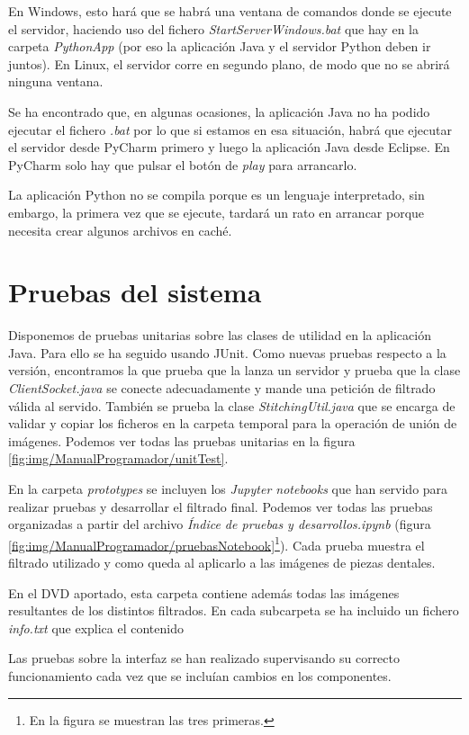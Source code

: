 
En Windows, esto hará que se habrá una ventana de comandos donde se ejecute el servidor, haciendo uso del fichero \textit{StartServerWindows.bat} que hay en la carpeta \textit{PythonApp} (por eso la aplicación Java y el servidor Python deben ir juntos). En Linux, el servidor corre en segundo plano, de modo que no se abrirá ninguna ventana.

Se ha encontrado que, en algunas ocasiones, la aplicación Java no ha podido ejecutar el fichero \textit{.bat} por lo que si estamos en esa situación, habrá que ejecutar el servidor desde PyCharm primero y luego la aplicación Java desde Eclipse. En PyCharm solo hay que pulsar el botón de \textit{play} para arrancarlo.

La aplicación Python no se compila porque es un lenguaje interpretado, sin embargo, la primera vez que se ejecute, tardará un rato en arrancar porque necesita crear algunos archivos en caché.

\section{Pruebas del sistema}
Disponemos de pruebas unitarias sobre las clases de utilidad en la aplicación Java. Para ello se ha seguido usando JUnit. Como nuevas pruebas respecto a la versión, encontramos la que prueba que la lanza un servidor y prueba que la clase \textit{ClientSocket.java} se conecte adecuadamente y mande una petición de filtrado válida al servido. También se prueba la clase \textit{StitchingUtil.java} que se encarga de validar y copiar los ficheros en la carpeta temporal para la operación de unión de imágenes. Podemos ver todas las pruebas unitarias en la figura \ref{fig:img/ManualProgramador/unitTest}. 


En la carpeta \textit{prototypes} se incluyen los \textit{Jupyter notebooks} que han servido para realizar pruebas y desarrollar el filtrado final. Podemos ver todas las pruebas organizadas a partir del archivo \textit{Índice de pruebas y desarrollos.ipynb} (figura \ref{fig:img/ManualProgramador/pruebasNotebook}\footnote{En la figura se muestran las tres primeras.}). Cada prueba muestra el filtrado utilizado y como queda al aplicarlo a las imágenes de piezas dentales. 

\newpage
En el DVD aportado, esta carpeta contiene además todas las imágenes resultantes de los distintos filtrados. En cada subcarpeta se ha incluido un fichero \textit{info.txt} que explica el contenido 


Las pruebas sobre la interfaz se han realizado supervisando su correcto funcionamiento cada vez que se incluían cambios en los componentes.